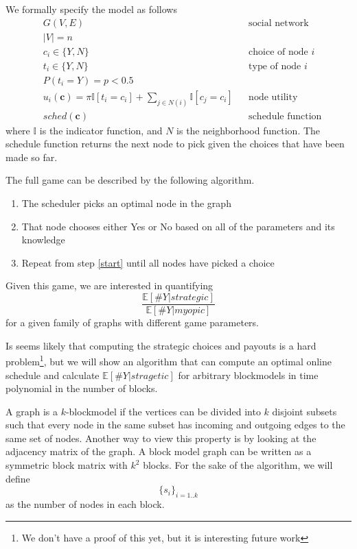 \documentclass{article}
\begin{document}
We formally specify the model as follows
\begin{align*}
  & G(V,E) && \text{social network} \\
  & |V| = n \\
  & c_i \in \{Y,N\} && \text{choice of node $i$} \\
  & t_i \in \{Y, N\} && \text{type of node $i$} \\
  & P(t_i = Y) = p < 0.5 \\
  & u_i(\mathbf c) = \pi \mathbb I[t_i = c_i] + \sum_{j \in N(i)}
  \mathbb I[c_j = c_i] && \text{node utility} \\
  & sched(\mathbf c) && \text{schedule function}
\end{align*}
where $\mathbb I$ is the indicator function, and $N$ is the neighborhood
function. The schedule function returns the next node to pick given
the choices that have been made so far.

The full game can be described by the following algorithm.
\begin{enumerate}
\item \label{start} The scheduler picks an optimal node in the graph
\item That node chooses either Yes or No based on all of the
  parameters and its knowledge
\item Repeat from step \ref{start} until all nodes have picked a
  choice
\end{enumerate}

Given this game, we are interested in quantifying
\begin{equation*}
  \frac{\mathbb E[\#Y|strategic]}{\mathbb E[\#Y|myopic]}
\end{equation*}
for a given family of graphs with different game parameters.

Is seems likely that computing the strategic choices and payouts is a
hard problem\footnote{We don't have a proof of this yet, but it is
  interesting future work}, but we will show an algorithm that can
compute an optimal online schedule and calculate $\mathbb
E[\#Y|stragetic]$ for arbitrary blockmodels in time polynomial in the
number of blocks.

A graph is a $k$-blockmodel if the vertices can be divided into $k$
disjoint subsets such that every node in the same subset has
incoming and outgoing edges to the same set of nodes. Another way to
view this property is by looking at the adjacency matrix of the
graph. A block model graph can be written as a symmetric block matrix
with $k^2$ blocks. For the sake of the algorithm, we will define
\begin{equation*}
  \{s_i\}_{i=1..k}
\end{equation*}
as the number of nodes in each block.
\end{document}
